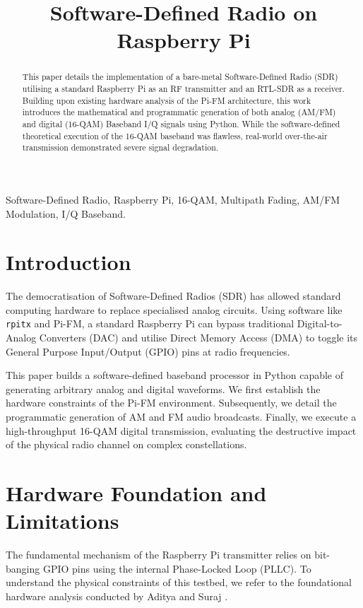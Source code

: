 \documentclass[conference]{IEEEtran}
\title{Software-Defined Radio on Raspberry Pi}
\author{
\IEEEauthorblockN{Subhodeep Chakraborty and G.V.V. Sharma}
\IEEEauthorblockA{
Department of Electrical Engineering\\
IIT Hyderabad\\
Email: gadepall@ee.iith.ac.in}
}
\begin{document}
\maketitle

\begin{abstract}
This paper details the implementation of a bare-metal Software-Defined Radio (SDR) utilising a standard Raspberry Pi as an RF transmitter and an RTL-SDR as a receiver. Building upon existing hardware analysis of the Pi-FM architecture, this work introduces the mathematical and programmatic generation of both analog (AM/FM) and digital (16-QAM) Baseband I/Q signals using Python. While the software-defined theoretical execution of the 16-QAM baseband was flawless, real-world over-the-air transmission demonstrated severe signal degradation. %
\end{abstract}

\begin{IEEEkeywords}
Software-Defined Radio, Raspberry Pi, 16-QAM, Multipath Fading, AM/FM Modulation, I/Q Baseband.
\end{IEEEkeywords}

\section{Introduction}
The democratisation of Software-Defined Radios (SDR) has allowed standard computing hardware to replace specialised analog circuits. Using software like \texttt{rpitx} and Pi-FM, a standard Raspberry Pi can bypass traditional Digital-to-Analog Converters (DAC) and utilise Direct Memory Access (DMA) to toggle its General Purpose Input/Output (GPIO) pins at radio frequencies. 

This paper builds a software-defined baseband processor in Python capable of generating arbitrary analog and digital waveforms. We first establish the hardware constraints of the Pi-FM environment. Subsequently, we detail the programmatic generation of AM and FM audio broadcasts. Finally, we execute a high-throughput 16-QAM digital transmission, evaluating the destructive impact of the physical radio channel on complex constellations.

\section{Hardware Foundation and Limitations}
The fundamental mechanism of the Raspberry Pi transmitter relies on bit-banging GPIO pins using the internal Phase-Locked Loop (PLLC). To understand the physical constraints of this testbed, we refer to the foundational hardware analysis conducted by Aditya and Suraj \cite{hw_analysis}.
\end{document}
